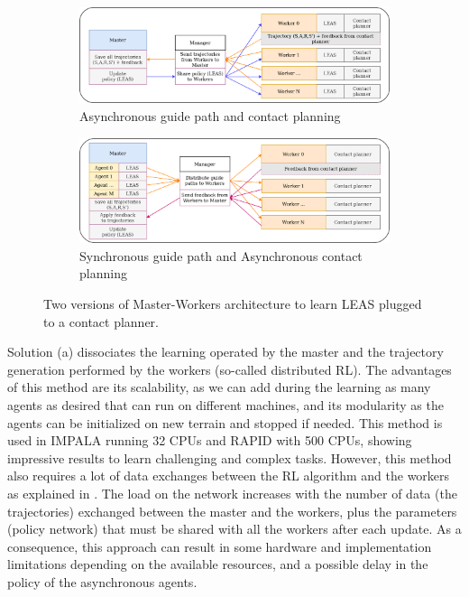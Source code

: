 \begin{figure}[t]
    \captionsetup[subfigure]{justification=centering}
    \begin{subfigure}[t]{0.9\linewidth}
    \includegraphics[width=\textwidth]{Figures/Chapter_LEAS/architecture_master_worker_0.png}
    \caption{Asynchronous guide path and contact planning}
    \label{fig:architecture_master_worker_synchronous}
    \end{subfigure}
    \begin{subfigure}[t]{0.9\linewidth}
    \includegraphics[width=\textwidth]{Figures/Chapter_LEAS/architecture_master_worker_1.png}
    \caption{Synchronous guide path and Asynchronous contact planning}
    \label{fig:architecture_master_worker_asynchronous}
    \end{subfigure}
    \caption{Two versions of Master-Workers architecture to learn LEAS plugged to a contact planner.}
    \label{fig:architecture_master_worker}
\end{figure}

Solution (a) dissociates the learning operated by the master and the trajectory generation performed by the workers (so-called distributed RL).
The advantages of this method are its scalability, as we can add during the learning as many agents as desired that can run on different machines, and its modularity as the agents can be initialized on new terrain and stopped if needed.
This method is used in IMPALA \cite{impala2018} running 32 CPUs and RAPID \cite{openai2019dota} with 500 CPUs, showing impressive results to learn challenging and complex tasks.
However, this method also requires a lot of data exchanges between the RL algorithm and the workers as explained in \cite{evol_vs_rl_majid_2021}. 
The load on the network increases with the number of data (the trajectories) exchanged between the master and the workers, plus the parameters (policy network) that must be shared with all the workers after each update.
As a consequence, this approach can result in some hardware and implementation limitations depending on the available resources, and a possible delay in the policy of the asynchronous agents.

